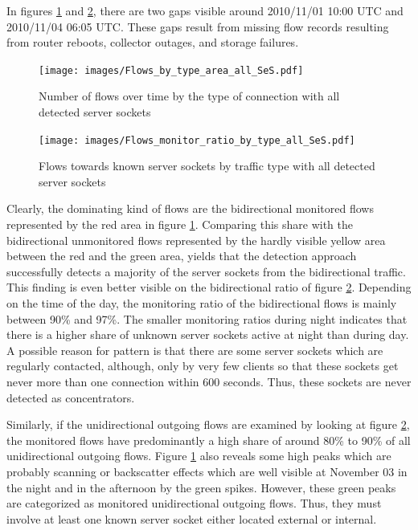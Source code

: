 In figures \ref{fig:flows_by_type} and \ref{fig:monitored_flows_by_type}, there are two gaps visible around 2010/11/01 10:00 UTC and 2010/11/04 06:05 UTC. 
These gaps result from missing flow records resulting from router reboots, collector outages, and storage failures\citep{Schatzmann:Mining}.
\begin{figure}
	[ht] \centering 
	\texttt{[image: images/Flows\_by\_type\_area\_all\_SeS.pdf]} \caption{Number of flows over time by the type of connection with all detected server sockets} 
	\label{fig:flows_by_type} 
\end{figure}
\begin{figure}
	[h] \centering 
	\texttt{[image: images/Flows\_monitor\_ratio\_by\_type\_all\_SeS.pdf]} \caption{Flows towards known server sockets by traffic type with all detected server sockets} 
	\label{fig:monitored_flows_by_type} 
\end{figure}

Clearly, the dominating kind of flows are the bidirectional monitored flows represented by the red area in figure \ref{fig:flows_by_type}. 
Comparing this share with the bidirectional unmonitored flows represented by the hardly visible yellow  area between the red and the green area, yields that the detection approach successfully detects a majority of the \glspl{server socket} from the bidirectional traffic. 
This finding is even better visible on the bidirectional ratio of figure \ref{fig:monitored_flows_by_type}. 
Depending on the time of the day, the monitoring ratio of the bidirectional flows is mainly between 90\% and 97\%. 
The smaller monitoring ratios during night indicates that there is a higher share of unknown \glspl{server socket} active at night than during day. 
A possible reason for pattern is that there are some \glspl{server socket} which are regularly contacted, although, only by very few clients so that these sockets get never more than one connection within 600 seconds. 
Thus, these sockets are never detected as concentrators.

Similarly, if the unidirectional outgoing flows are examined by looking at figure \ref{fig:monitored_flows_by_type}, the monitored flows have predominantly a high share of around 80\% to 90\% of all unidirectional outgoing flows. 
Figure \ref{fig:flows_by_type} also reveals some high peaks which are probably scanning or backscatter effects which are well visible at November 03 in the night and in the afternoon by the green spikes. 
However, these green peaks are categorized as monitored unidirectional outgoing flows. 
Thus, they must involve at least one known \gls{server socket} either located external or internal.

